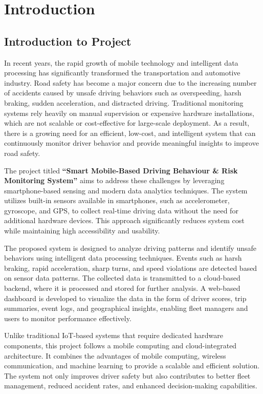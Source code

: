 \chapter{Introduction}
\label{chap:intro}

\section{Introduction to Project}
\label{sec:intro_project}
In recent years, the rapid growth of mobile technology and intelligent data processing has significantly transformed the transportation and automotive industry. Road safety has become a major concern due to the increasing number of accidents caused by unsafe driving behaviors such as overspeeding, harsh braking, sudden acceleration, and distracted driving. Traditional monitoring systems rely heavily on manual supervision or expensive hardware installations, which are not scalable or cost-effective for large-scale deployment. As a result, there is a growing need for an efficient, low-cost, and intelligent system that can continuously monitor driver behavior and provide meaningful insights to improve road safety.

The project titled \textbf{``Smart Mobile-Based Driving Behaviour \& Risk Monitoring System''} aims to address these challenges by leveraging smartphone-based sensing and modern data analytics techniques. The system utilizes built-in sensors available in smartphones, such as accelerometer, gyroscope, and GPS, to collect real-time driving data without the need for additional hardware devices. This approach significantly reduces system cost while maintaining high accessibility and usability.

The proposed system is designed to analyze driving patterns and identify unsafe behaviors using intelligent data processing techniques. Events such as harsh braking, rapid acceleration, sharp turns, and speed violations are detected based on sensor data patterns. The collected data is transmitted to a cloud-based backend, where it is processed and stored for further analysis. A web-based dashboard is developed to visualize the data in the form of driver scores, trip summaries, event logs, and geographical insights, enabling fleet managers and users to monitor performance effectively.

Unlike traditional IoT-based systems that require dedicated hardware components, this project follows a mobile computing and cloud-integrated architecture. It combines the advantages of mobile computing, wireless communication, and machine learning to provide a scalable and efficient solution. The system not only improves driver safety but also contributes to better fleet management, reduced accident rates, and enhanced decision-making capabilities.

